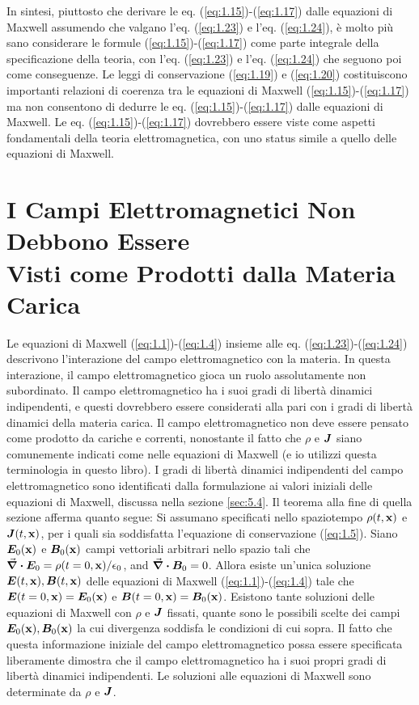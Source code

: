 In sintesi, piuttosto che derivare le eq. (\ref{eq:1.15})-(\ref{eq:1.17}) dalle equazioni di Maxwell assumendo che valgano l'eq. (\ref{eq:1.23}) e l'eq. (\ref{eq:1.24}), è molto più sano considerare le formule (\ref{eq:1.15})-(\ref{eq:1.17}) come parte integrale della specificazione della teoria, con l'eq. (\ref{eq:1.23}) e l'eq. (\ref{eq:1.24}) che seguono poi come conseguenze. Le leggi di conservazione (\ref{eq:1.19}) e (\ref{eq:1.20}) costituiscono importanti relazioni di coerenza tra le equazioni di Maxwell (\ref{eq:1.15})-(\ref{eq:1.17}) ma non consentono di dedurre le eq. (\ref{eq:1.15})-(\ref{eq:1.17}) dalle equazioni di Maxwell. Le eq. (\ref{eq:1.15})-(\ref{eq:1.17}) dovrebbero essere viste come aspetti fondamentali della teoria elettromagnetica, con uno status simile a quello delle equazioni di Maxwell.

\section[Non il Prodotto di Cariche e Correnti]{I Campi Elettromagnetici Non Debbono Essere \\Visti come Prodotti dalla Materia Carica}\label{sec:1.3}
Le equazioni di Maxwell (\ref{eq:1.1})-(\ref{eq:1.4}) insieme alle eq. (\ref{eq:1.23})-(\ref{eq:1.24}) descrivono l'interazione del campo elettromagnetico con la materia. In questa interazione, il campo elettromagnetico gioca un ruolo assolutamente non subordinato. Il campo elettromagnetico ha i suoi gradi di libertà dinamici indipendenti, e questi dovrebbero essere considerati alla pari con i gradi di libertà dinamici della materia carica. Il campo elettromagnetico non deve essere pensato come prodotto da cariche e correnti, nonostante il fatto che $\rho$ e $\vb*{J}$ siano comunemente indicati come  nelle equazioni di Maxwell (e io utilizzi questa terminologia in questo libro). I gradi di libertà dinamici indipendenti del campo elettromagnetico sono identificati dalla formulazione ai valori iniziali delle equazioni di Maxwell, discussa nella sezione \ref{sec:5.4}. Il teorema alla fine di quella sezione afferma quanto segue: 
Si assumano specificati nello spaziotempo $\rho(t, \vb{x})$ e $\vb*{J}(t, \vb{x})$, per i quali sia soddisfatta l'equazione di conservazione (\ref{eq:1.5}). 
Siano $\vb*{E}_0(\vb{x})$ e $\vb*{B}_0(\vb{x})$ campi vettoriali arbitrari nello spazio tali che $\div{\vb*{E}_0} = \rho(t=0, \vb{x})/\epsilon_0$, and $\div{\vb*{B}_0} = 0$. 
Allora esiste un'unica soluzione $\vb*{E}(t, \vb{x}), \vb*{B}(t, \vb{x})$ delle equazioni di Maxwell (\ref{eq:1.1})-(\ref{eq:1.4}) tale che 
$\vb*{E}(t=0, \vb{x}) = \vb*{E}_0(\vb{x})$ e $\vb*{B}(t=0, \vb{x}) = \vb*{B}_0(\vb{x})$. Esistono tante soluzioni delle equazioni di Maxwell con 
$\rho$ e $\vb*{J}$ fissati, quante sono le possibili scelte dei campi $\vb*{E}_0(\vb{x}), \vb*{B}_0(\vb{x})$ la cui divergenza soddisfa le condizioni di cui sopra. Il fatto che questa informazione iniziale del campo elettromagnetico possa essere specificata liberamente dimostra che il campo elettromagnetico ha i suoi propri gradi di libertà dinamici indipendenti. Le soluzioni alle equazioni di Maxwell  sono determinate da $\rho$ e $\vb*{J}$.

